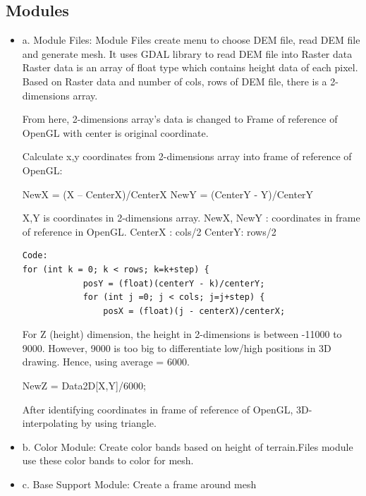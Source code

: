 \documentclass[11pt]{article}
\begin{document}
\subsection{Modules} 
\begin{itemize}
\item a. Module Files:
Module Files create menu to choose DEM file, read DEM file and generate mesh.
It uses GDAL library to read DEM file into Raster data
Raster data is an array of float type which contains height data of each pixel. Based on Raster data and number of cols, rows of DEM file, there is a 2-dimensions array.

From here, 2-dimensions array's data is changed to Frame of reference of OpenGL with center is original coordinate.

Calculate x,y coordinates from 2-dimensions array into frame of reference of OpenGL:

NewX = (X – CenterX)/CenterX
NewY = (CenterY - Y)/CenterY

X,Y is coordinates in 2-dimensions array.
NewX, NewY : coordinates in frame of reference in OpenGL.
CenterX : cols/2
CenterY: rows/2

\begin{lstlisting}
Code: 
for (int k = 0; k < rows; k=k+step) {
            posY = (float)(centerY - k)/centerY;
            for (int j =0; j < cols; j=j+step) {
                posX = (float)(j - centerX)/centerX;
\end{lstlisting}

For Z (height) dimension, the height in 2-dimensions is between -11000 to 9000. However,  9000 is too big to differentiate low/high positions in 3D drawing. Hence, using average = 6000.

NewZ = Data2D[X,Y]/6000;

After identifying coordinates in frame of reference of OpenGL, 3D-interpolating by using triangle.

\item b.  Color Module:
Create color bands based on height of terrain.Files module use these color bands to color for mesh.
\item c.  Base Support Module:
Create a frame around mesh

\end{itemize}
\end{document}
